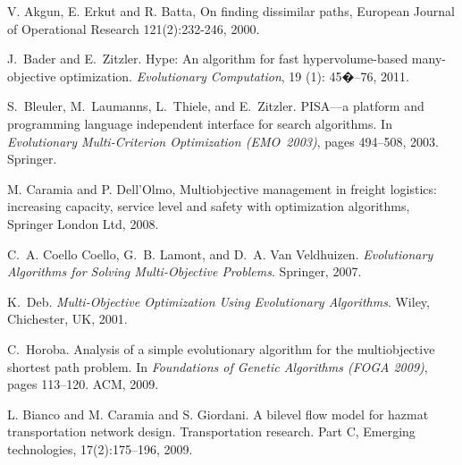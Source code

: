 \documentclass[preprint,12pt]{elsarticle}
\begin{document}
\begin{thebibliography}{00}

V. Akgun, E. Erkut and R. Batta, 
On finding dissimilar paths, 
European Journal of Operational Research 121(2):232-246, 2000.

J.~Bader and E.~Zitzler.
\newblock Hype: An algorithm for fast hypervolume-based many-objective
  optimization.
\newblock \emph{Evolutionary Computation}, 19 (1): 45�--76,
  2011.

S.~Bleuler, M.~Laumanns, L.~Thiele, and E.~Zitzler.
\newblock PISA---a platform and programming language independent interface for
  search algorithms.
\newblock In \emph{Evolutionary
  Multi-Criterion Optimization {(EMO~2003)}}, pages
  494--508, 2003. Springer.

M. Caramia and P. Dell'Olmo, 
Multiobjective management in freight logistics: increasing capacity, service level and safety with optimization algorithms,
Springer London Ltd, 2008.

C.~A. {Coello Coello}, G.~B. {Lamont}, and D.~A. {Van Veldhuizen}.
\newblock \emph{Evolutionary Algorithms for Solving Multi-Objective Problems}.
\newblock Springer, 2007.

K.~Deb.
\newblock \emph{Multi-Objective Optimization Using Evolutionary Algorithms}.
\newblock Wiley, Chichester, UK, 2001.

C.~Horoba.
\newblock Analysis of a simple evolutionary algorithm for the multiobjective
  shortest path problem.
\newblock In \emph{Foundations of Genetic Algorithms {(FOGA 2009)}}, pages
  113--120. ACM, 2009. 

L. Bianco and M. Caramia and S. Giordani.
\newblock A bilevel flow model for hazmat transportation network design.
\newblock Transportation research. Part C, Emerging technologies, 17(2):175--196, 2009.



% 


\end{thebibliography}
\end{document}
